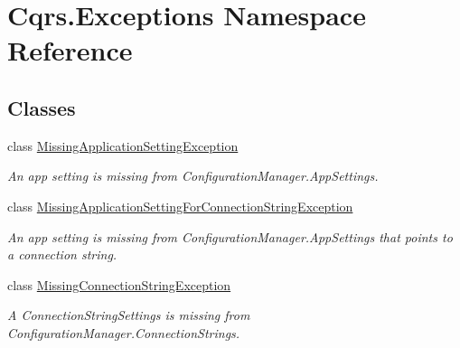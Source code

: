 \hypertarget{namespaceCqrs_1_1Exceptions}{}\section{Cqrs.\+Exceptions Namespace Reference}
\label{namespaceCqrs_1_1Exceptions}
\subsection*{Classes}
\begin{DoxyCompactItemize}
\item 
class \hyperlink{classCqrs_1_1Exceptions_1_1MissingApplicationSettingException}{Missing\+Application\+Setting\+Exception}
\begin{DoxyCompactList}\small\item\em An app setting is missing from Configuration\+Manager.\+App\+Settings. \end{DoxyCompactList}\item 
class \hyperlink{classCqrs_1_1Exceptions_1_1MissingApplicationSettingForConnectionStringException}{Missing\+Application\+Setting\+For\+Connection\+String\+Exception}
\begin{DoxyCompactList}\small\item\em An app setting is missing from Configuration\+Manager.\+App\+Settings that points to a connection string. \end{DoxyCompactList}\item 
class \hyperlink{classCqrs_1_1Exceptions_1_1MissingConnectionStringException}{Missing\+Connection\+String\+Exception}
\begin{DoxyCompactList}\small\item\em A Connection\+String\+Settings is missing from Configuration\+Manager.\+Connection\+Strings. \end{DoxyCompactList}\end{DoxyCompactItemize}
